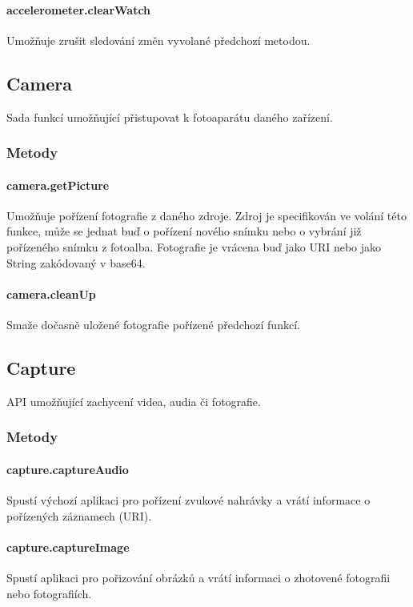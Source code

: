 \paragraph{accelerometer.clearWatch}
Umožňuje zrušit sledování změn vyvolané předchozí metodou.

\subsection{Camera}
Sada funkcí umožňující přistupovat k fotoaparátu daného zařízení.

\subsubsection{Metody}
\paragraph{camera.getPicture}
Umožňuje pořízení fotografie z daného zdroje. Zdroj je specifikován ve volání této funkce, může se jednat buď o pořízení nového snímku nebo o vybrání již pořízeného snímku z fotoalba. Fotografie je vrácena buď jako URI nebo jako String zakódovaný v base64.

\paragraph{camera.cleanUp}
Smaže dočasně uložené fotografie pořízené předchozí funkcí.

\subsection{Capture}
API umožňující zachycení videa, audia či fotografie.

\subsubsection{Metody}
\paragraph{capture.captureAudio}
Spustí výchozí aplikaci pro pořízení zvukové nahrávky a vrátí informace o pořízených záznamech (URI).

\paragraph{capture.captureImage}
Spustí aplikaci pro pořizování obrázků a vrátí informaci o zhotovené fotografii nebo fotografiích.

